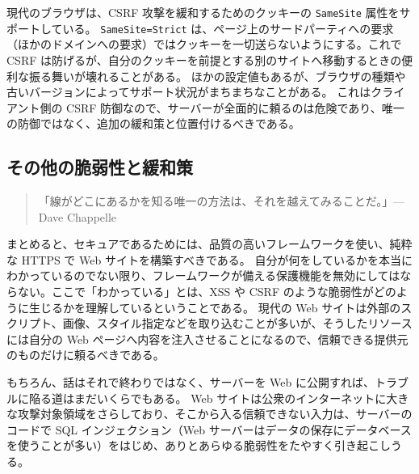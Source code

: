 \documentclass[uplatex]{jsarticle}
\def\label#1{}%
\begin{document}
\begin{rem}\label{rem:ch11-samesite}
現代のブラウザは、CSRF 攻撃を緩和するためのクッキーの \texttt{SameSite} 属性をサポートしている。
\texttt{SameSite=Strict} は、ページ上のサードパーティへの要求（ほかのドメインへの要求）ではクッキーを一切送らないようにする。これで CSRF は防げるが、自分のクッキーを前提とする別のサイトへ移動するときの便利な振る舞いが壊れることがある。
ほかの設定値もあるが、ブラウザの種類や古いバージョンによってサポート状況がまちまちなことがある。
これはクライアント側の CSRF 防御なので、サーバーが全面的に頼るのは危険であり、唯一の防御ではなく、追加の緩和策と位置付けるべきである。
\end{rem}

\subsection{その他の脆弱性と緩和策}\label{subsec:ch11-more}

\begin{quote}
「線がどこにあるかを知る唯一の方法は、それを越えてみることだ。」\hfill --- Dave Chappelle
\end{quote}

まとめると、セキュアであるためには、品質の高いフレームワークを使い、純粋な HTTPS で Web サイトを構築すべきである。
自分が何をしているかを本当にわかっているのでない限り、フレームワークが備える保護機能を無効にしてはならない。ここで「わかっている」とは、XSS や CSRF のような脆弱性がどのように生じるかを理解しているということである。
現代の Web サイトは外部のスクリプト、画像、スタイル指定などを取り込むことが多いが、そうしたリソースには自分の Web ページへ内容を注入させることになるので、信頼できる提供元のものだけに頼るべきである。

もちろん、話はそれで終わりではなく、サーバーを Web に公開すれば、トラブルに陥る道はまだいくらでもある。
Web サイトは公衆のインターネットに大きな攻撃対象領域をさらしており、そこから入る信頼できない入力は、サーバーのコードで SQL インジェクション（Web サーバーはデータの保存にデータベースを使うことが多い）をはじめ、ありとあらゆる脆弱性をたやすく引き起こしうる。
\end{document}
